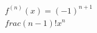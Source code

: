 \documentclass[preview]{standalone}
\begin{document}
\begin{align*}
f^{(n)}(x)=(-1)^{n+1}\\frac{(n-1)!}{x^n}
\end{align*}
\end{document}
